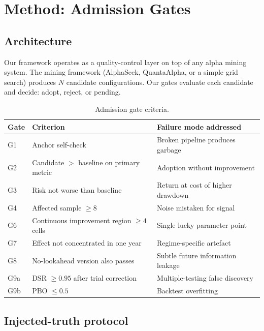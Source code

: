 \documentclass[11pt]{article}
\begin{document}

\section{Method: Admission Gates}
\label{sec:method}

\subsection{Architecture}

Our framework operates as a quality-control layer on top of any alpha mining
system. The mining framework (AlphaSeek, QuantaAlpha, or a simple grid search)
produces $N$ candidate configurations. Our gates evaluate each candidate and
decide: adopt, reject, or pending.

\begin{table}[htbp]
\centering
\caption{Admission gate criteria.}
\label{tab:gates}
\small
\begin{tabular}{@{}lp{4.5cm}p{5cm}@{}}
\toprule
Gate & Criterion & Failure mode addressed \\
\midrule
G1 & Anchor self-check & Broken pipeline produces garbage \\
G2 & Candidate $>$ baseline on primary metric & Adoption without improvement \\
G3 & Risk not worse than baseline & Return at cost of higher drawdown \\
G4 & Affected sample $\ge 8$ & Noise mistaken for signal \\
G6 & Continuous improvement region $\ge 4$ cells & Single lucky parameter point \\
G7 & Effect not concentrated in one year & Regime-specific artefact \\
G8 & No-lookahead version also passes & Subtle future information leakage \\
G9a & DSR $\ge 0.95$ after trial correction & Multiple-testing false discovery \\
G9b & PBO $\le 0.5$ & Backtest overfitting \\
\bottomrule
\end{tabular}
\end{table}

\subsection{Injected-truth protocol}
\end{document}
